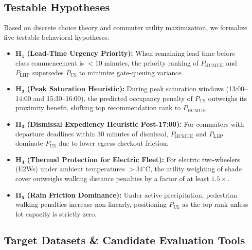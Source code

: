 \documentclass[11pt,a4paper]{article}
\begin{document}
\subsection{Testable Hypotheses}
Based on discrete choice theory and commuter utility maximization, we formalize five testable behavioral hypotheses:
\begin{itemize}[leftmargin=1.5em]
    \item $\mathbf{H_1}$ \textbf{(Lead-Time Urgency Priority):} When remaining lead time before class commencement is $< 10$ minutes, the priority ranking of $P_{\text{HCMUE}}$ and $P_{\text{LHP}}$ supersedes $P_{\text{US}}$ to minimize gate-queuing variance.
    \item $\mathbf{H_2}$ \textbf{(Peak Saturation Heuristic):} During peak saturation windows (13:00--14:00 and 15:30--16:00), the predicted occupancy penalty of $P_{\text{US}}$ outweighs its proximity benefit, shifting top recommendation rank to $P_{\text{HCMUE}}$.
    \item $\mathbf{H_3}$ \textbf{(Dismissal Expediency Heuristic Post-17:00):} For commuters with departure deadlines within 30 minutes of dismissal, $P_{\text{HCMUE}}$ and $P_{\text{LHP}}$ dominate $P_{\text{US}}$ due to lower egress checkout friction.
    \item $\mathbf{H_4}$ \textbf{(Thermal Protection for Electric Fleet):} For electric two-wheelers (E2Ws) under ambient temperatures $> 34^\circ\text{C}$, the utility weighting of shade cover outweighs walking distance penalties by a factor of at least $1.5\times$.
    \item $\mathbf{H_5}$ \textbf{(Rain Friction Dominance):} Under active precipitation, pedestrian walking penalties increase non-linearly, positioning $P_{\text{US}}$ as the top rank unless lot capacity is strictly zero.
\end{itemize}

\subsection{Target Datasets \& Candidate Evaluation Tools}
\end{document}
